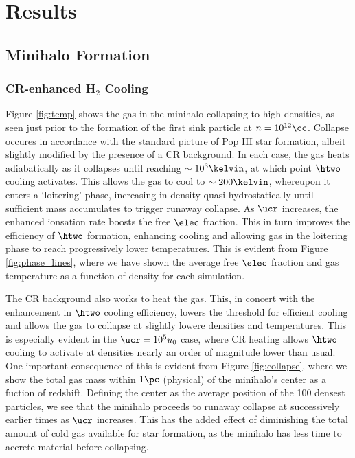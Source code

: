 \section{Results}
\label{sec:results}
\subsection{Minihalo Formation}
\subsubsection{CR-enhanced H$_2$ Cooling}
\label{sec:initial_collapse}

Figure \ref{fig:temp} shows the gas in the minihalo collapsing to high densities, as seen just prior to the formation of the first sink particle at $n=10^{12}\cc$.  Collapse occures in accordance with the standard picture of Pop III star formation, albeit slightly modified by the presence of a CR background.  In each case, the gas heats adiabatically as it collapses until reaching $\sim10^3\kelvin$, at which point $\htwo$ cooling activates.  This allows the gas to cool to $\sim200\kelvin$, whereupon it enters a `loitering' phase, increasing in density quasi-hydrostatically until sufficient mass accumulates to trigger runaway collapse.  As $\ucr$ increases, the enhanced ionsation rate boosts the free $\elec$ fraction.  This in turn improves the efficiency of $\htwo$ formation, enhancing cooling and allowing gas in the loitering phase to reach progressively lower temperatures.  This is evident from Figure \ref{fig:phase_lines}, where we have shown the average free $\elec$ fraction and gas temperature as a function of density for each simulation.

The CR background also works to heat the gas.  This, in concert with the enhancement in $\htwo$ cooling efficiency, lowers the threshold for efficient cooling and allows the gas to collapse at slightly lowere densities and temperatures.  This is especially evident in the $\ucr = 10^5 u_0$ case, where CR heating allows $\htwo$ cooling to activate at densities nearly an order of magnitude lower than usual.  One important consequence of this is evident from Figure \ref{fig:collapse}, where we show the total gas mass within $1\pc$ (physical) of the minihalo's center as a fuction of redshift.  Defining the center as the average position of the 100 densest particles, we see that the minihalo proceeds to runaway collapse at successively earlier times as $\ucr$ increases.  This has the added effect of diminishing the total amount of cold gas available for star formation, as the minihalo has less time to accrete material before collapsing.
